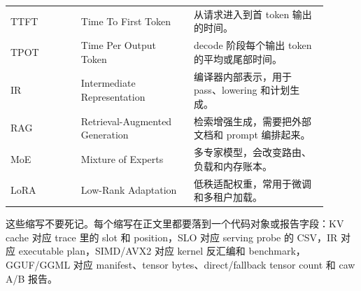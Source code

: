 \begin{center}
\begin{tabular}{@{}p{0.20\linewidth}p{0.32\linewidth}p{0.38\linewidth}@{}}
TTFT & Time To First Token & 从请求进入到首 token 输出的时间。 \\
TPOT & Time Per Output Token & decode 阶段每个输出 token 的平均或尾部时间。 \\
IR & Intermediate Representation & 编译器内部表示，用于 pass、lowering 和计划生成。 \\
RAG & Retrieval-Augmented Generation & 检索增强生成，需要把外部文档和 prompt 编排起来。 \\
MoE & Mixture of Experts & 多专家模型，会改变路由、负载和内存账本。 \\
LoRA & Low-Rank Adaptation & 低秩适配权重，常用于微调和多租户加载。 \\
\bottomrule
\end{tabular}
\end{center}

这些缩写不要死记。每个缩写在正文里都要落到一个代码对象或报告字段：KV cache 对应 trace 里的 slot 和 position，SLO 对应 serving probe 的 CSV，IR 对应 executable plan，SIMD/AVX2 对应 kernel 反汇编和 benchmark，GGUF/GGML 对应 manifest、tensor bytes、direct/fallback tensor count 和 caw A/B 报告。
